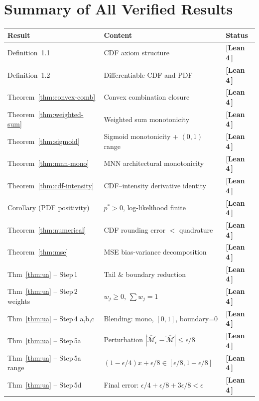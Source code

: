 \documentclass[11pt]{article}
\theoremstyle{remark}
\newcommand{\verified}{%
  \textcolor{green!60!black}{\textbf{[Lean\,4\,\checkmark]}}}
\newcommand{\cM}{\mathcal{M}}
\begin{document}
\section{Summary of All Verified Results}
\label{sec:summary}

\begin{table}[h!]
\centering
\renewcommand{\arraystretch}{1.35}
\begin{tabular}{>{\raggedright}p{5.2cm} p{6.5cm} l}
\toprule
\textbf{Result} & \textbf{Content} & \textbf{Status} \\
\midrule
Definition~1.1 & CDF axiom structure & \verified{} \\
Definition~1.2 & Differentiable CDF and PDF & \verified{} \\
Theorem~\ref{thm:convex-comb} & Convex combination closure & \verified{} \\
Theorem~\ref{thm:weighted-sum} & Weighted sum monotonicity & \verified{} \\
Theorem~\ref{thm:sigmoid} & Sigmoid monotonicity + $(0,1)$ range & \verified{} \\
Theorem~\ref{thm:mnn-mono} & MNN architectural monotonicity & \verified{} \\
Theorem~\ref{thm:cdf-intensity} & CDF--intensity derivative identity & \verified{} \\
Corollary (PDF positivity) & $p^*>0$, log-likelihood finite & \verified{} \\
Theorem~\ref{thm:numerical} & CDF rounding error $<$ quadrature & \verified{} \\
Theorem~\ref{thm:mse} & MSE bias-variance decomposition & \verified{} \\
\midrule
Thm~\ref{thm:ua} -- Step\,1 & Tail \& boundary reduction & \verified{} \\
Thm~\ref{thm:ua} -- Step\,2 weights & $w_j \ge 0$, $\sum w_j = 1$ & \verified{} \\
Thm~\ref{thm:ua} -- Step\,4 a,b,c & Blending: mono, $[0,1]$, boundary=0 & \verified{} \\
Thm~\ref{thm:ua} -- Step\,5a & Perturbation $|\hat{\cM}_\epsilon - \hat{\cM}| \le \epsilon/8$ & \verified{} \\
Thm~\ref{thm:ua} -- Step\,5a range & $(1-\epsilon/4)x+\epsilon/8 \in [\epsilon/8,1-\epsilon/8]$ & \verified{} \\
Thm~\ref{thm:ua} -- Step\,5d & Final error: $\epsilon/4 + \epsilon/8 + 3\epsilon/8 < \epsilon$ & \verified{} \\

\end{tabular}
\end{table}
\end{document}
